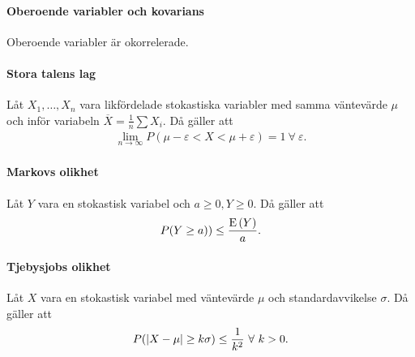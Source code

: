\proof

\paragraph{Oberoende variabler och kovarians}
Oberoende variabler är okorrelerade.

\proof

\paragraph{Stora talens lag}
Låt $X_1, \dots, X_n$ vara likfördelade stokastiska variabler med samma väntevärde $\mu$ och inför variabeln $\overline{X} = \frac{1}{n}\sum X_i$. Då gäller att
\begin{align*}
	\lim\limits_{n\to\infty}P(\mu - \varepsilon < X < \mu + \varepsilon) = 1\ \forall\ \varepsilon.
\end{align*}

\proof

\paragraph{Markovs olikhet}
Låt $Y$ vara en stokastisk variabel och $a\geq 0, Y\geq 0$. Då gäller att
\begin{align*}
	P(Y\geq a))\leq\frac{\text{E}\left(Y\right)}{a}.
\end{align*}

\proof

\paragraph{Tjebysjobs olikhet}
Låt $X$ vara en stokastisk variabel med väntevärde $\mu$ och standardavvikelse $\sigma$. Då gäller att
\begin{align*}
	P(\abs{X - \mu}\geq k\sigma)\leq\frac{1}{k^2}\ \forall\ k > 0.
\end{align*}